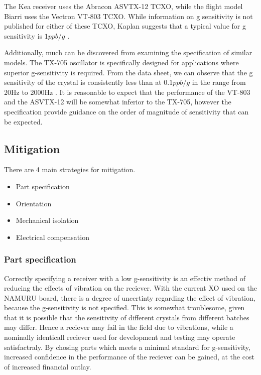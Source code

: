 \begin{comment}
http://www.vectron.com/products/g_sensitivity/Vig-tutorial%
\end{comment}

The  Kea receiver uses the Abracon ASVTX-12 \ac{TCXO}\cite{ASTX12Datasheet}, while the flight model Biarri uses the Vectron  VT-803 TCXO\cite{VT803Datasheet}. While information on g sensitivity is not published for either of these \ac{TCXO}, 
Kaplan suggests that a typical value for g sensitivity is $1 ppb/g$ \cite{Kaplan}.

Additionally, much can be discovered from examining the specification of similar models. The TX-705 oscillator is specifically designed for applications where superior g-sensitivity is required. From the data sheet, we can observe that the g sensitivity of the crystal is consistently less than at $0.1ppb/g$ in the range from 20Hz to 2000Hz \cite{TX705Datasheet}. It is reasonable to expect that the performance of the VT-803 and the ASVTX-12 will be somewhat inferior to the TX-705, however the specification provide guidance on the order of magnitude of sensitivity that can be expected.

\subsection{Mitigation}
There are 4 main strategies for mitigation.

\begin{itemize}
\item{Part specification}
\item{Orientation}
\item{Mechanical isolation}
\item{Electrical compensation}
\end{itemize}

\subsubsection{Part specification}
Correctly specifying a receiver with a low g-sensitivity is an effectiv method of reducing the effects of vibration on the reciever. With the current \ac{XO} used on the \ac{NAMURU} board, there is a degree of uncertinty regarding the effect of vibration, because the g-sensitivity is not specified. This is somewhat troublesome, given that it is possible that the sensitivity of different crystals from different batches may differ. Hence a reciever may fail in the field due to vibrations, while a nominally identicall reciever used for development and testing may operate satisfactraly. By chosing parts which meets a minimal standard for g-sensitivity, increased confidence in the performance of the reciever can be gained, at the cost of increased financial outlay. 

